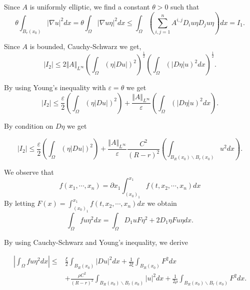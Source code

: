 \documentclass{article}
\begin{document}
Since $A$ is uniformly elliptic, we find a constant $\theta>0$ such that 
\begin{equation*}
\theta\int_{B_r(x_0)}|\nabla u|^2dx=\theta\int_\Omega|\nabla u\eta|^2dx\leq \int_\Omega \left(\sum_{i,j=1}^n A^{i,j}D_iu\eta D_ju\eta\right) dx=I_1.
\end{equation*}

Since $A$ is bounded, Cauchy-Schwarz we get,
\begin{equation*}
|I_2| \leq 2\Vert A\Vert_{L^\infty}\left(\int_\Omega\left(\eta |Du|\right)^2\right)^{{\frac 1 2}}\left(\int_\Omega (|D\eta| u)^2  dx\right)^{{\frac 1 2}}.
\end{equation*}

By using Young's inequality with $\varepsilon=\theta$ we get
\begin{equation*}
|I_2|\leq {\frac \varepsilon 2}\left(\int_\Omega\left(\eta |Du|\right)^2\right)+{\frac {\Vert A\Vert_{L^\infty}} {\varepsilon}}\left(\int_\Omega (|D\eta| u)^2  dx\right).
\end{equation*}

By condition on $D\eta$ we get

\begin{equation*}
|I_2|\leq {\frac \varepsilon 2}\left(\int_\Omega\left(\eta |Du|\right)^2\right)+{\frac {\Vert A\Vert_{L^\infty}} {\varepsilon}}{\frac {C^2} {(R-r)^2}}\left(\int_{B_R(x_0)\backslash B_r(x_0)} u^2  dx\right).
\end{equation*}

We observe that 
\begin{equation*}
f(x_1,\cdots,x_n) = \partial x_1\int_{(x_0)_1}^{x_1} f(t,x_2,\cdots,x_n)dx
\end{equation*}
By letting $F(x) = \int_{(x_0)_1}^{x_1} f(t,x_2,\cdots,x_n)dx$ we obtain
\begin{equation*}
\int_\Omega fu\eta^2dx = \int_\Omega D_1 uF\eta^2 + 2D_1\eta Fu\eta dx.
\end{equation*}

By using Cauchy-Schwarz and Young's inequality, we derive

\begin{align*}
|\int_\Omega fu\eta^2dx| \leq &{\frac \xi 2}\int_{B_R(x_0)} |D u|^2dx+{\frac 1 {2\xi}}\int_{B_R(x_0)} F^2dx\\
& +{\frac {\rho C^2} {(R-r)^2}}\int_{B_R(x_0)\backslash B_r(x_0)}|u|^2dx + {\frac {1} {2\rho}}\int_{B_R(x_0)\backslash B_r(x_0)} F^2dx.
\end{align*}
\end{document}
